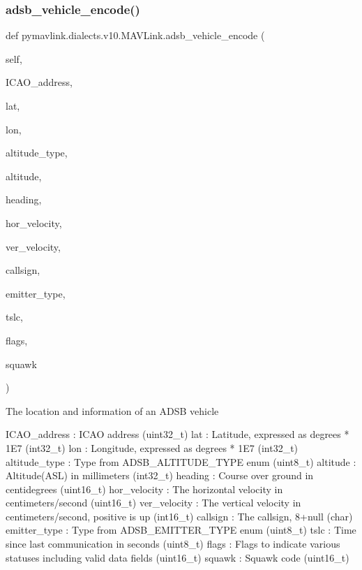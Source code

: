 \subsubsection{\texorpdfstring{adsb\+\_\+vehicle\+\_\+encode()}{adsb\_vehicle\_encode()}}
{\footnotesize\ttfamily def pymavlink.\+dialects.\+v10.\+M\+A\+V\+Link.\+adsb\+\_\+vehicle\+\_\+encode (\begin{DoxyParamCaption}\item[{}]{self,  }\item[{}]{I\+C\+A\+O\+\_\+address,  }\item[{}]{lat,  }\item[{}]{lon,  }\item[{}]{altitude\+\_\+type,  }\item[{}]{altitude,  }\item[{}]{heading,  }\item[{}]{hor\+\_\+velocity,  }\item[{}]{ver\+\_\+velocity,  }\item[{}]{callsign,  }\item[{}]{emitter\+\_\+type,  }\item[{}]{tslc,  }\item[{}]{flags,  }\item[{}]{squawk }\end{DoxyParamCaption})}

\begin{DoxyVerb}The location and information of an ADSB vehicle

ICAO_address              : ICAO address (uint32_t)
lat                       : Latitude, expressed as degrees * 1E7 (int32_t)
lon                       : Longitude, expressed as degrees * 1E7 (int32_t)
altitude_type             : Type from ADSB_ALTITUDE_TYPE enum (uint8_t)
altitude                  : Altitude(ASL) in millimeters (int32_t)
heading                   : Course over ground in centidegrees (uint16_t)
hor_velocity              : The horizontal velocity in centimeters/second (uint16_t)
ver_velocity              : The vertical velocity in centimeters/second, positive is up (int16_t)
callsign                  : The callsign, 8+null (char)
emitter_type              : Type from ADSB_EMITTER_TYPE enum (uint8_t)
tslc                      : Time since last communication in seconds (uint8_t)
flags                     : Flags to indicate various statuses including valid data fields (uint16_t)
squawk                    : Squawk code (uint16_t)\end{DoxyVerb}
 \mbox{\label{classpymavlink_1_1dialects_1_1v10_1_1MAVLink_aa24433c20c6689d1f0ad0ec1d3ccb08c}} 
